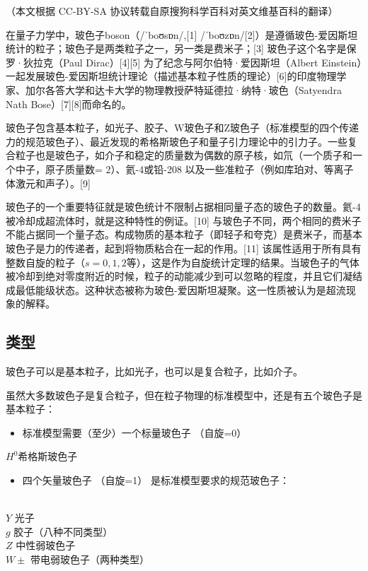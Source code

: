 
（本文根据 CC-BY-SA 协议转载自原搜狗科学百科对英文维基百科的翻译）

在量子力学中，玻色子boson（/ˈboʊsɒn/,[1] /ˈboʊzɒn/[2]）是遵循玻色-爱因斯坦统计的粒子；玻色子是两类粒子之一，另一类是费米子；[3] 玻色子这个名字是保罗·狄拉克（Paul Dirac）[4][5] 为了纪念与阿尔伯特·爱因斯坦（Albert Einstein）一起发展玻色-爱因斯坦统计理论（描述基本粒子性质的理论）[6]的印度物理学家、加尔各答大学和达卡大学的物理教授萨特延德拉·纳特·玻色（Satyendra Nath Bose）[7][8]而命名的。

玻色子包含基本粒子，如光子、胶子、W玻色子和Z玻色子（标准模型的四个传递力的规范玻色子）、最近发现的希格斯玻色子和量子引力理论中的引力子。一些复合粒子也是玻色子，如介子和稳定的质量数为偶数的原子核，如氘（一个质子和一个中子，原子质量数= 2）、氦-4或铅-208 以及一些准粒子（例如库珀对、等离子体激元和声子）。[9]

玻色子的一个重要特征就是玻色统计不限制占据相同量子态的玻色子的数量。氦-4被冷却成超流体时，就是这种特性的例证。[10] 与玻色子不同，两个相同的费米子不能占据同一个量子态。构成物质的基本粒子（即轻子和夸克）是费米子，而基本玻色子是力的传递者，起到将物质粘合在一起的作用。[11] 该属性适用于所有具有整数自旋的粒子（$s=0,1,2$等），这是作为自旋统计定理的结果。当玻色子的气体被冷却到绝对零度附近的时候，粒子的动能减少到可以忽略的程度，并且它们凝结成最低能级状态。这种状态被称为玻色-爱因斯坦凝聚。这一性质被认为是超流现象的解释。

\subsection{类型}
玻色子可以是基本粒子，比如光子，也可以是复合粒子，比如介子。

虽然大多数玻色子是复合粒子，但在粒子物理的标准模型中，还是有五个玻色子是基本粒子：
\begin{itemize}
\item 标准模型需要（至少）一个标量玻色子 （自旋=0）
\end{itemize}
$H^0$希格斯玻色子
\begin{itemize}
\item 四个矢量玻色子 （自旋=1） 是标准模型要求的规范玻色子：
\end{itemize}\\
$Y$   光子\\
$g$   胶子（八种不同类型）\\
$Z$   中性弱玻色子\\
$W\pm$   带电弱玻色子（两种类型）\\

